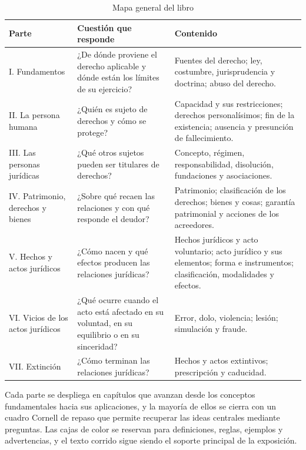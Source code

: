\documentclass[12pt,oneside]{book}
\begin{document}
\begin{table}[H]
\centering
\small
\renewcommand{\arraystretch}{1.25}
\begin{tabularx}{\textwidth}{>{\raggedright\arraybackslash}p{} >{\raggedright\arraybackslash}p{} >{\raggedright\arraybackslash}X}
\toprule
\textbf{Parte} & \textbf{Cuestión que responde} & \textbf{Contenido} \\
\midrule
I. Fundamentos & ¿De dónde proviene el derecho aplicable y dónde están los límites de su ejercicio? & Fuentes del derecho; ley, costumbre, jurisprudencia y doctrina; abuso del derecho. \\
II. La persona humana & ¿Quién es sujeto de derechos y cómo se protege? & Capacidad y sus restricciones; derechos personalísimos; fin de la existencia; ausencia y presunción de fallecimiento. \\
III. Las personas jurídicas & ¿Qué otros sujetos pueden ser titulares de derechos? & Concepto, régimen, responsabilidad, disolución, fundaciones y asociaciones. \\
IV. Patrimonio, derechos y bienes & ¿Sobre qué recaen las relaciones y con qué responde el deudor? & Patrimonio; clasificación de los derechos; bienes y cosas; garantía patrimonial y acciones de los acreedores. \\
V. Hechos y actos jurídicos & ¿Cómo nacen y qué efectos producen las relaciones jurídicas? & Hechos jurídicos y acto voluntario; acto jurídico y sus elementos; forma e instrumentos; clasificación, modalidades y efectos. \\
VI. Vicios de los actos jurídicos & ¿Qué ocurre cuando el acto está afectado en su voluntad, en su equilibrio o en su sinceridad? & Error, dolo, violencia; lesión; simulación y fraude. \\
VII. Extinción & ¿Cómo terminan las relaciones jurídicas? & Hechos y actos extintivos; prescripción y caducidad. \\
\bottomrule
\end{tabularx}
\caption{Mapa general del libro}
\end{table}

Cada parte se despliega en capítulos que avanzan desde los conceptos fundamentales hacia sus aplicaciones, y la mayoría de ellos se cierra con un cuadro Cornell de repaso que permite recuperar las ideas centrales mediante preguntas. Las cajas de color se reservan para definiciones, reglas, ejemplos y advertencias, y el texto corrido sigue siendo el soporte principal de la exposición.
\end{document}
